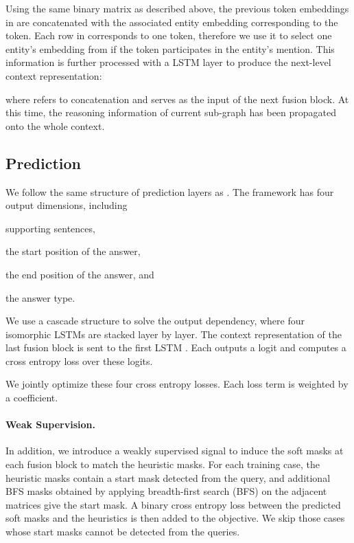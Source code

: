 \documentclass[11pt,a4paper]{article}
\begin{document}
Using the same binary matrix  as described above, 
the previous token embeddings in  are concatenated with the associated entity embedding corresponding to the token. 
Each row in  corresponds to one token, therefore we use it to select one entity's embedding from  if the token participates in the entity's mention. 
This information is further processed with a LSTM layer \cite{hochreiter1997long} to produce the next-level context representation:

where  refers to concatenation and  serves as the input of the next fusion block. At this time, the reasoning information of current sub-graph has been propagated onto the whole context.

\subsection{Prediction}
We follow the same structure of prediction layers as \cite{yang2018hotpotqa}. 
The framework has four output dimensions, including
\begin{inparaenum}
    \item supporting sentences, 
    \item the start position of the answer,
    \item the end position of the answer, and
    \item the answer type.
\end{inparaenum}
We use a cascade structure to solve the output dependency, where four isomorphic LSTMs  are stacked layer by layer. The context representation of the last fusion block is sent to the first LSTM . Each  outputs a logit  and computes a cross entropy loss over these logits. 


We jointly optimize these four cross entropy losses. Each loss term is weighted by a coefficient.


\paragraph{Weak Supervision.}
In addition, we introduce a weakly supervised signal to induce the soft masks at each fusion block to match the heuristic masks. 
For each training case, the heuristic masks contain a start mask detected from the query, and additional BFS masks obtained by applying breadth-first search (BFS) on the adjacent matrices give the start mask. 
A binary cross entropy loss between the predicted soft masks and the heuristics is then added to the objective.
We skip those cases whose start masks cannot be detected from the queries.
 
\end{document}
